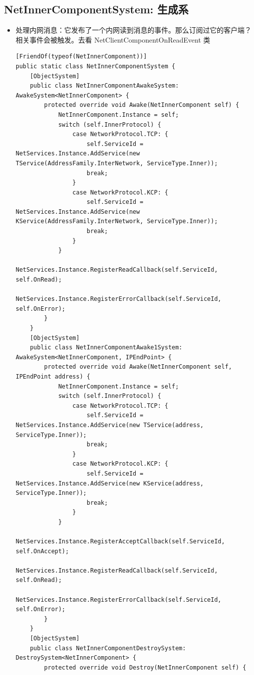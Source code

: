 \documentclass[9pt, b5paper]{article}
\begin{document}
\subsection{NetInnerComponentSystem: 生成系}
\label{sec-8-9}
\begin{itemize}
\item 处理内网消息：它发布了一个内网读到消息的事件。那么订阅过它的客户端？相关事件会被触发。去看 NetClientComponentOnReadEvent 类
\begin{verbatim}
[FriendOf(typeof(NetInnerComponent))]
public static class NetInnerComponentSystem {
    [ObjectSystem]
    public class NetInnerComponentAwakeSystem: AwakeSystem<NetInnerComponent> {
        protected override void Awake(NetInnerComponent self) {
            NetInnerComponent.Instance = self;
            switch (self.InnerProtocol) {
                case NetworkProtocol.TCP: {
                    self.ServiceId = NetServices.Instance.AddService(new TService(AddressFamily.InterNetwork, ServiceType.Inner));
                    break;
                }
                case NetworkProtocol.KCP: {
                    self.ServiceId = NetServices.Instance.AddService(new KService(AddressFamily.InterNetwork, ServiceType.Inner));
                    break;
                }
            }
            NetServices.Instance.RegisterReadCallback(self.ServiceId, self.OnRead);
            NetServices.Instance.RegisterErrorCallback(self.ServiceId, self.OnError);
        }
    }
    [ObjectSystem]
    public class NetInnerComponentAwake1System: AwakeSystem<NetInnerComponent, IPEndPoint> {
        protected override void Awake(NetInnerComponent self, IPEndPoint address) {
            NetInnerComponent.Instance = self;
            switch (self.InnerProtocol) {
                case NetworkProtocol.TCP: {
                    self.ServiceId = NetServices.Instance.AddService(new TService(address, ServiceType.Inner));
                    break;
                }
                case NetworkProtocol.KCP: {
                    self.ServiceId = NetServices.Instance.AddService(new KService(address, ServiceType.Inner));
                    break;
                }
            }
            NetServices.Instance.RegisterAcceptCallback(self.ServiceId, self.OnAccept);
            NetServices.Instance.RegisterReadCallback(self.ServiceId, self.OnRead);
            NetServices.Instance.RegisterErrorCallback(self.ServiceId, self.OnError);
        }
    }
    [ObjectSystem]
    public class NetInnerComponentDestroySystem: DestroySystem<NetInnerComponent> {
        protected override void Destroy(NetInnerComponent self) {

\end{verbatim}
\end{itemize}
\end{document}
